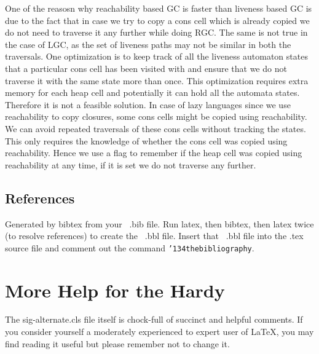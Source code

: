 \documentclass{sig-alternate}
\begin{document}
One of the reasosn why reachability based GC is faster than liveness based GC is due to the fact that 
in case we try to copy a cons cell which is already copied we do not need to traverse it any further while
 doing RGC. The same is not true in the case of LGC, as the set of liveness paths may not be similar in 
both the traversals. One optimization is to keep track of all the liveness automaton states that a particular 
cons cell has been visited with and ensure that we do not traverse it with the same state more than once. 
This optimization requires extra memory for each heap cell and potentially it can hold all the automata states. 
Therefore it is not a feasible solution. In case of lazy languages since we use reachability to copy closures, 
some cons cells might be copied using reachability. We can avoid repeated traversals of these cons cells without 
tracking the states. This only requires the knowledge of whether the cons cell was copied using reachability. 
Hence we use a flag to remember if the heap cell was copied using reachability at any time, if it is set we do 
not traverse any further.

\subsection{References}
{}


Generated by bibtex from your ~.bib file.  Run latex,
then bibtex, then latex twice (to resolve references)
to create the ~.bbl file.  Insert that ~.bbl file into
the .tex source file and comment out
the command \texttt{{\char'134}thebibliography}.
\section{More Help for the Hardy}
The sig-alternate.cls file itself is chock-full of succinct
and helpful comments.  If you consider yourself a moderately
experienced to expert user of \LaTeX, you may find reading
it useful but please remember not to change it.
\end{document}
